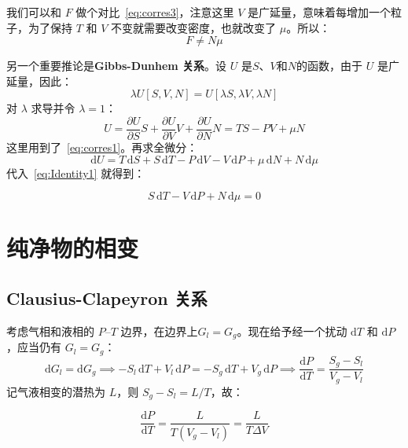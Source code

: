 我们可以和 $F$ 做个对比~\eqref{eq:corres3}，注意这里 $V$ 是广延量，意味着每增加一个粒子，为了保持 $T$ 和 $V$ 不变就需要改变密度，也就改变了 $\mu$。所以：
\begin{equation}
    F \neq N\mu
\end{equation}

另一个重要推论是\textbf{Gibbs-Dunhem 关系}。设 $U$ 是$S$、$V$和$N$的函数，由于 $U$ 是广延量，因此：
\begin{equation}
    \lambda U[S,V,N] = U[\lambda S, \lambda V, \lambda N]
\end{equation}
对 $\lambda$ 求导并令 $\lambda=1$：
\begin{equation}
    U = \frac{\partial U}{\partial S}S + \frac{\partial U}{\partial V}V + \frac{\partial U}{\partial N}N = TS - PV + \mu N
\end{equation}
这里用到了~\eqref{eq:corres1}。再求全微分：
\begin{equation}
    \mathrm{d}U = T\,\mathrm{d}S + S\,\mathrm{d}T - P\,\mathrm{d}V - V\,\mathrm{d}P + \mu\,\mathrm{d}N + N\,\mathrm{d}\mu
\end{equation}
代入~\eqref{eq:Identity1} 就得到：
\begin{corollary}
    \begin{equation}
        S\,\mathrm{d}T - V\,\mathrm{d}P + N\,\mathrm{d}\mu = 0
    \end{equation}
\end{corollary}



\section{纯净物的相变}
\subsection{Clausius-Clapeyron 关系}
考虑气相和液相的 $P$--$T$ 边界，在边界上$G_l=G_g$。现在给予经一个扰动 $\mathrm{d}T$ 和 $\mathrm{d}P$，应当仍有 $G_l=G_g$：
\begin{equation}
    \mathrm{d}G_l=\mathrm{d}G_g
    \implies -S_l\,\mathrm{d}T+V_l\,\mathrm{d}P=-S_g\,\mathrm{d}T+V_g\,\mathrm{d}P
    \implies \frac{\mathrm{d}P}{\mathrm{d}T}=\frac{S_g-S_l}{V_g-V_l}
\end{equation}
记气液相变的潜热为 $L$，则 $S_g-S_l=L/T$，故：
\begin{corollary}
    \begin{equation}
        \frac{\mathrm{d}P}{\mathrm{d}T}=\frac{L}{T(V_g - V_l)}=\frac{L}{T\Delta V}
    \end{equation}
\end{corollary}

